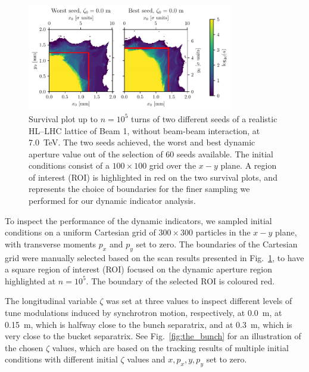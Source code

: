 \begin{figure}[htp]
    \centering
    \includegraphics[width=0.8\textwidth]{6_lhc_dynamic_indicators/figs/updated/quick_scan.pdf}
    \caption{Survival plot up to $n=10^5$ turns of two different seeds of a realistic HL--LHC lattice of Beam 1, without beam-beam interaction, at \SI{7.0}{TeV}. The two seeds achieved, the worst and best dynamic aperture value out of the selection of 60 seeds available. The initial conditions consist of a $100\times100$ grid over the $x-y$ plane. A region of interest (ROI) is highlighted in red on the two survival plots, and represents the choice of boundaries for the finer sampling we performed for our dynamic indicator analysis.}
    \label{fig:seed_presentation}
\end{figure}

To inspect the performance of the dynamic indicators, we sampled initial conditions on a uniform Cartesian grid of $300\times300$ particles in the $x-y$ plane, with transverse moments $p_x$ and $p_y$ set to zero. The boundaries of the Cartesian grid were manually selected based on the scan results presented in Fig.~\ref{fig:seed_presentation}, to have a square region of interest (ROI) focused on the dynamic aperture region highlighted at $n=10^5$. The boundary of the selected ROI is coloured red.

The longitudinal variable $\zeta$ was set at three values to inspect different levels of tune modulations induced by synchrotron motion, respectively, at \SI{0.0}{\meter}, at \SI{0.15}{\meter}, which is halfway close to the bunch separatrix, and at \SI{0.3}{\meter}, which is very close to the bucket separatrix. See Fig.~\ref{fig:the_bunch} for an illustration of the chosen $\zeta$ values, which are based on the tracking results of multiple initial conditions with different initial $\zeta$ values and $x, p_x, y, p_y$ set to zero. 

